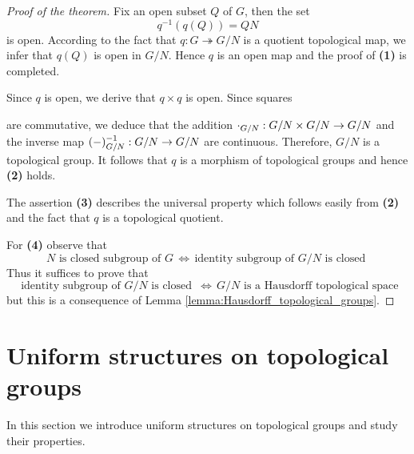 \documentclass[10pt]{amsart}
\begin{document}
\begin{proof}[Proof of the theorem]
	Fix an open subset $Q$ of $G$, then the set
	$$q^{-1}\left(q\left(Q\right)\right) = QN$$
	is open. According to the fact that $q:G \twoheadrightarrow G/N$ is a quotient topological map, we infer that $q(Q)$ is open in $G/N$. Hence $q$ is an open map and the proof of \textbf{(1)} is completed.

	Since $q$ is open, we derive that $q\times q$ is open. Since squares
	\begin{center}
	\end{center}
	are commutative, we deduce that the addition $\cdot_{G/N}:G/N \times G/N \rightarrow G/N$ and the inverse map $(-)^{-1}_{G/N}:G/N\rightarrow G/N$ are continuous. Therefore, $G/N$ is a topological group. It follows that $q$ is a morphism of topological groups and hence \textbf{(2)} holds.

	The assertion \textbf{(3)} describes the universal property which follows easily from \textbf{(2)} and the fact that $q$ is a topological quotient.

	For \textbf{(4)} observe that
	$$N\mbox{ is closed subgroup of }G\,\Leftrightarrow\,\mbox{identity subgroup of }G/N\mbox{ is closed }$$
	Thus it suffices to prove that
	$$\mbox{ identity subgroup of }G/N\mbox{ is closed }\,\Leftrightarrow\,G/N\mbox{ is a Hausdorff topological space}$$
	but this is a consequence of Lemma \ref{lemma:Hausdorff_topological_groups}.
\end{proof}

\section{Uniform structures on topological groups}
\noindent
In this section we introduce uniform structures on topological groups and study their properties.
\end{document}
